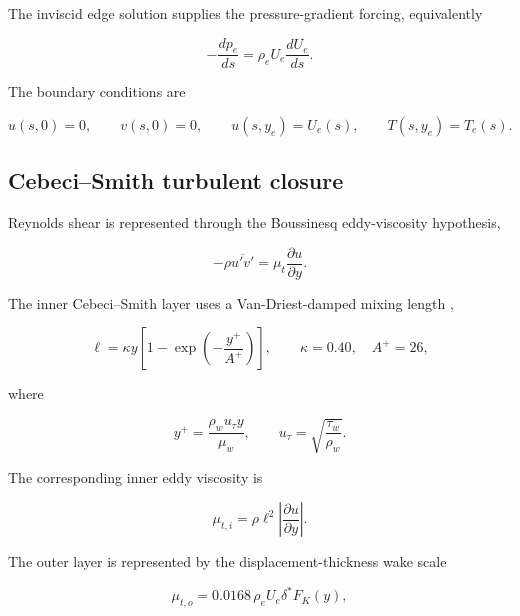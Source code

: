 The inviscid edge solution supplies the pressure-gradient forcing, equivalently

\begin{equation}
-\frac{dp_e}{ds}=\rho_eU_e\frac{dU_e}{ds}.
\label{eq:blimp_edge_pressure_gradient}
\end{equation}

The boundary conditions are

\begin{equation}
u(s,0)=0,\qquad v(s,0)=0,\qquad
u(s,y_e)=U_e(s),\qquad T(s,y_e)=T_e(s).
\label{eq:blimp_boundary_conditions}
\end{equation}

\subsection{Cebeci--Smith turbulent closure}

Reynolds shear is represented through the Boussinesq eddy-viscosity hypothesis,

\begin{equation}
-\rho\overline{u'v'}=\mu_t\frac{\partial u}{\partial y}.
\label{eq:blimp_boussinesq}
\end{equation}

The inner Cebeci--Smith layer uses a Van-Driest-damped mixing length
\cite{CebeciSmith,BLIMPVerification},

\begin{equation}
\ell=\kappa y
\left[1-\exp\left(-\frac{y^+}{A^+}\right)\right],
\qquad
\kappa=0.40,\quad A^+=26,
\label{eq:blimp_mixing_length}
\end{equation}

where

\begin{equation}
y^+=\frac{\rho_wu_\tau y}{\mu_w},
\qquad
u_\tau=\sqrt{\frac{\tau_w}{\rho_w}}.
\label{eq:blimp_wall_units}
\end{equation}

The corresponding inner eddy viscosity is

\begin{equation}
\mu_{t,i}=\rho\ell^2
\left|\frac{\partial u}{\partial y}\right|.
\label{eq:blimp_inner_eddy_viscosity}
\end{equation}

The outer layer is represented by the displacement-thickness wake scale

\begin{equation}
\mu_{t,o}
=0.0168\,\rho_eU_e\delta^*F_K(y),
\label{eq:blimp_outer_eddy_viscosity}
\end{equation}

